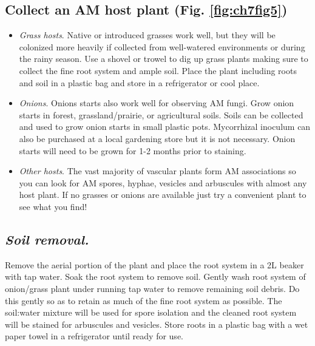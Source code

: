 \documentclass[]{book}
\providecommand{\tightlist}{%
  \setlength{\itemsep}{0pt}\setlength{\parskip}{0pt}}
\begin{document}
\hypertarget{collect-an-am-host-plant-fig.-reffigch7fig5}{%
\subsection{\texorpdfstring{\textbf{Collect an AM host plant} (Fig. \ref{fig:ch7fig5})}{Collect an AM host plant (Fig. \ref{fig:ch7fig5})}}\label{collect-an-am-host-plant-fig.-reffigch7fig5}}

\begin{itemize}
\tightlist
\item
  \emph{Grass hosts}. Native or introduced grasses work well, but they will be colonized more heavily if collected from well-watered environments or during the rainy season. Use a shovel or trowel to dig up grass plants making sure to collect the fine root system and ample soil. Place the plant including roots and soil in a plastic bag and store in a refrigerator or cool place.
\item
  \emph{Onions}. Onions starts also work well for observing AM fungi. Grow onion starts in forest, grassland/prairie, or agricultural soils. Soils can be collected and used to grow onion starts in small plastic pots. Mycorrhizal inoculum can also be purchased at a local gardening store but it is not necessary. Onion starts will need to be grown for 1-2 months prior to staining.
\item
  \emph{Other hosts}. The vast majority of vascular plants form AM associations so you can look for AM spores, hyphae, vesicles and arbuscules with almost any host plant. If no grasses or onions are available just try a convenient plant to see what you find!
\end{itemize}

\hypertarget{soil-removal.}{%
\subsection{\texorpdfstring{\emph{Soil removal.}}{Soil removal.}}\label{soil-removal.}}

Remove the aerial portion of the plant and place the root system in a 2L beaker with tap water. Soak the root system to remove soil. Gently wash root system of onion/grass plant under running tap water to remove remaining soil debris. Do this gently so as to retain as much of the fine root system as possible. The soil:water mixture will be used for spore isolation and the cleaned root system will be stained for arbuscules and vesicles. Store roots in a plastic bag with a wet paper towel in a refrigerator until ready for use.
\end{document}
